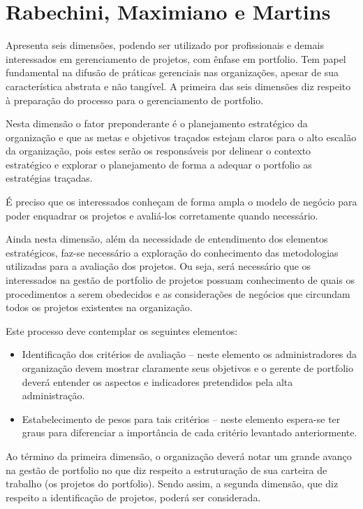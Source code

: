 \documentclass[12pt,a4paper,ruledheader,tocpage=prefix,floatnumber=continuous,pagestart=folhaderosto,font=times]{abnt}
\begin{document}
\section{Rabechini, Maximiano e Martins}
Apresenta seis dimensões, podendo ser utilizado por profissionais e demais interessados em gerenciamento de projetos, com ênfase em portfolio. Tem papel
fundamental na difusão de práticas gerenciais nas organizações, apesar de sua característica abstrata e não tangível. A primeira das seis dimensões diz 
respeito à preparação do processo para o gerenciamento de portfolio\cite{RABECHINI2005}. 

Nesta dimensão o fator preponderante é o planejamento estratégico da organização e que as metas e objetivos traçados estejam claros para o alto escalão da 
organização, pois estes serão os responsáveis por delinear o contexto estratégico e explorar o planejamento de forma a adequar o portfolio as estratégias 
traçadas. 

É preciso que os interessados conheçam de forma ampla o modelo de negócio para poder enquadrar os projetos e avaliá-los
corretamente quando necessário.\cite{RABECHINI2005}

Ainda nesta dimensão, além da necessidade de entendimento dos elementos estratégicos, faz-se necessário a exploração do conhecimento das metodologias 
utilizadas para a avaliação dos projetos. Ou seja, será necessário que os interessados na gestão de portfolio de projetos possuam conhecimento de quais 
os procedimentos a serem obedecidos e as considerações de negócios que circundam todos os projetos existentes na organização.

Este processo deve contemplar os seguintes elementos:\cite{RABECHINI2005}

\begin{itemize}
 \item Identificação dos critérios de avaliação – neste elemento
os administradores da organização devem mostrar claramente seus objetivos e o gerente de portfolio deverá
entender os aspectos e indicadores pretendidos pela alta
administração.
\item Estabelecimento de pesos para tais critérios – neste elemento espera-se ter graus para diferenciar a importância
de cada critério levantado anteriormente.
\end{itemize}

Ao término da primeira dimensão, o organização deverá notar um grande avanço na gestão de portfolio no que diz respeito a estruturação de sua carteira 
de trabalho (os projetos do portfolio). Sendo assim, a segunda dimensão, que diz respeito a identificação de projetos, poderá ser considerada.
\end{document}
